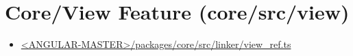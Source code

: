 \section{Core/View Feature (core/src/view)}



\begin{itemize}
  \item \href{https://github.com/angular/angular/blob/master/packages/core/src/linker/view_ref.ts}
        {<ANGULAR-MASTER>/packages/core/src/linker/view\_ref.ts}
\end{itemize}







